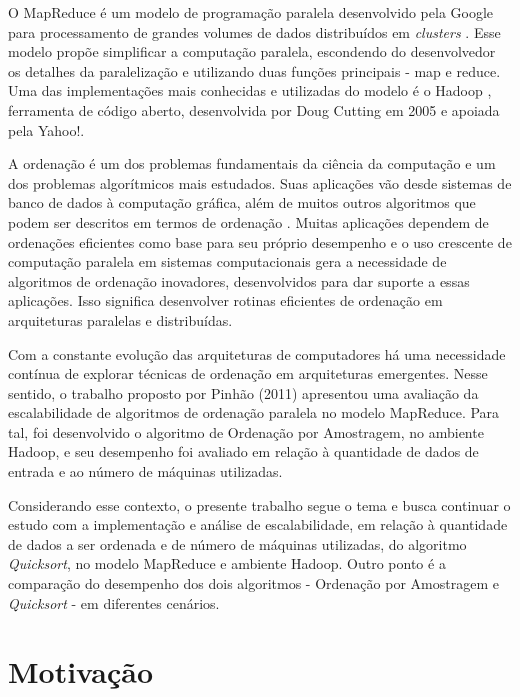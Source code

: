 O MapReduce é um modelo de programação paralela desenvolvido pela Google para processamento de grandes volumes de dados distribuídos em \textit{clusters} \cite{Dean:2008}. Esse modelo propõe simplificar a computação paralela, escondendo  do desenvolvedor os detalhes da paralelização e utilizando duas funções principais - map e reduce.
Uma das implementações mais conhecidas e utilizadas do modelo é o Hadoop \cite{White:2009}, ferramenta de código aberto, desenvolvida por Doug Cutting em 2005 e apoiada pela Yahoo!. 

 A ordenação é um dos problemas fundamentais da ciência da computação e um dos problemas algorítmicos mais estudados. Suas aplicações vão desde sistemas de banco de dados à computação gráfica, além de muitos outros algoritmos que podem ser descritos em termos de ordenação \cite{Satish:2009,Amato:1996}.  Muitas aplicações dependem de ordenações eficientes como base para seu próprio desempenho e o uso crescente de computação paralela em sistemas computacionais gera a necessidade de algoritmos de ordenação inovadores, desenvolvidos para dar suporte a essas aplicações. Isso significa desenvolver rotinas eficientes de ordenação em arquiteturas paralelas e distribuídas. 
 

Com a constante evolução das arquiteturas de computadores há uma necessidade contínua de explorar técnicas de ordenação em arquiteturas emergentes. Nesse sentido, o trabalho proposto por %
Pinhão (2011) apresentou uma avaliação da escalabilidade 
de algoritmos de ordenação paralela no modelo MapReduce. Para tal, foi desenvolvido o algoritmo de Ordenação por Amostragem, no ambiente Hadoop, e seu desempenho foi avaliado em relação à quantidade de dados de entrada e ao número de máquinas utilizadas. 

Considerando esse contexto, o presente trabalho segue o tema e busca continuar o estudo com a implementação e análise de escalabilidade, em relação à quantidade de dados a ser ordenada e de número de máquinas utilizadas, do algoritmo \textit{Quicksort}, no modelo MapReduce e ambiente Hadoop. Outro ponto é a comparação do desempenho dos dois algoritmos - Ordenação por Amostragem e \textit{Quicksort} - em diferentes cenários.


\section{Motivação}

